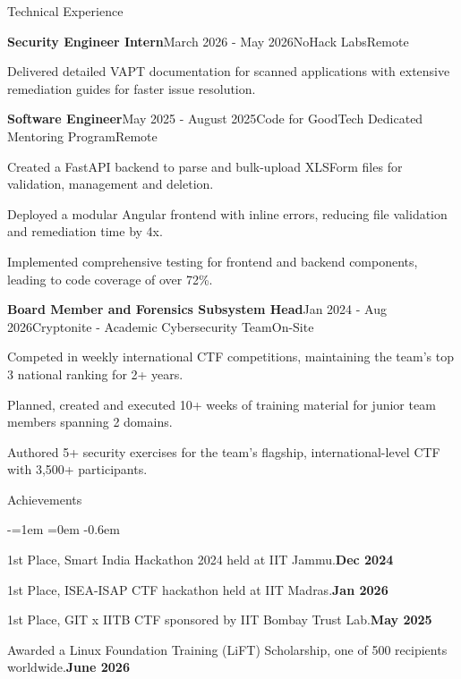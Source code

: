 \documentclass{resume}
\begin{document}
\begin{rSection}{Technical Experience}
\begin{rSubsection}{\bf Security Engineer Intern}{March 2026 - May 2026}{NoHack Labs}{Remote}
\item Delivered detailed VAPT documentation for scanned applications with extensive remediation guides for faster issue resolution.
\end{rSubsection}
\begin{rSubsection}{\bf Software Engineer}{May 2025 - August 2025}{Code for GoodTech Dedicated Mentoring Program}{Remote}
\item Created a FastAPI backend to parse and bulk-upload XLSForm files for validation, management and deletion.
\item Deployed a modular Angular frontend with inline errors, reducing file validation and remediation time by 4x.
\item Implemented comprehensive testing for frontend and backend components, leading to code coverage of over 72\%.
\end{rSubsection}
\begin{rSubsection}{\bf Board Member and Forensics Subsystem Head}{Jan 2024 - Aug 2026}{Cryptonite - Academic Cybersecurity Team}{On-Site}
\item Competed in weekly international CTF competitions, maintaining the team's top 3 national ranking for 2+ years.
\item Planned, created and executed 10+ weeks of training material for junior team members spanning 2 domains.
\item Authored 5+ security exercises for the team's flagship, international-level CTF with 3,500+ participants.
\end{rSubsection}
\end{rSection}

\vspace{-0.2em}
\begin{rSection}{Achievements}
\begin{list}{-}{\leftmargin=1em \itemindent=0em}
\itemsep -0.6em
\item 1st Place, Smart India Hackathon 2024 held at IIT Jammu.\hfill \textbf{Dec 2024}
\item 1st Place, ISEA-ISAP CTF hackathon held at IIT Madras.\hfill \textbf{Jan 2026}
\item 1st Place, GIT x IITB CTF sponsored by IIT Bombay Trust Lab.\hfill \textbf{May 2025}
\item Awarded a Linux Foundation Training (LiFT) Scholarship, one of 500 recipients worldwide.\hfill \textbf{June 2026}
\end{list}
\end{rSection}
\end{document}
